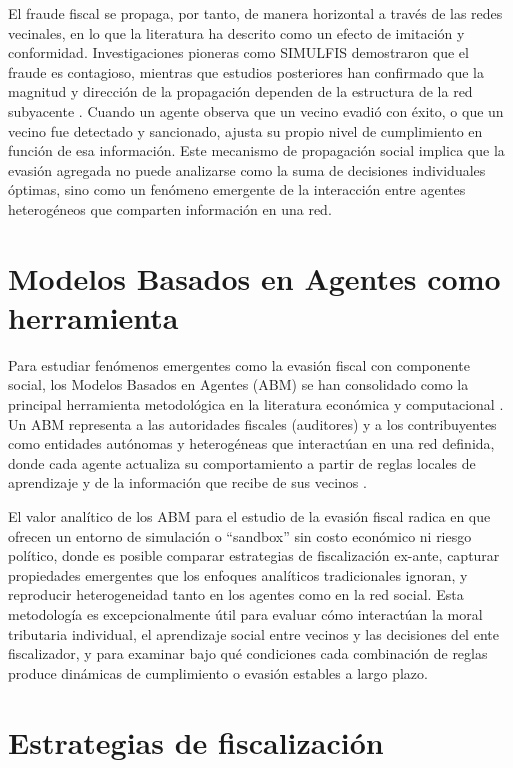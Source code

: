 El fraude fiscal se propaga, por tanto, de manera horizontal a través de las redes vecinales, en lo que la literatura ha descrito como un efecto de imitación y conformidad. Investigaciones pioneras como SIMULFIS \parencite{llacer2018simulfis, noguera2014tax} demostraron que el fraude es contagioso, mientras que estudios posteriores han confirmado que la magnitud y dirección de la propagación dependen de la estructura de la red subyacente \parencite{chica2021evolutionary}. Cuando un agente observa que un vecino evadió con éxito, o que un vecino fue detectado y sancionado, ajusta su propio nivel de cumplimiento en función de esa información. Este mecanismo de propagación social implica que la evasión agregada no puede analizarse como la suma de decisiones individuales óptimas, sino como un fenómeno emergente de la interacción entre agentes heterogéneos que comparten información en una red.

\section{Modelos Basados en Agentes como herramienta}
\label{sec:abm-breve}

Para estudiar fenómenos emergentes como la evasión fiscal con componente social, los Modelos Basados en Agentes (ABM) se han consolidado como la principal herramienta metodológica en la literatura económica y computacional \parencite{hokamp2010income}. Un ABM representa a las autoridades fiscales (auditores) y a los contribuyentes como entidades autónomas y heterogéneas que interactúan en una red definida, donde cada agente actualiza su comportamiento a partir de reglas locales de aprendizaje y de la información que recibe de sus vecinos \parencite{andrei2014agent}.

El valor analítico de los ABM para el estudio de la evasión fiscal radica en que ofrecen un entorno de simulación o ``sandbox'' sin costo económico ni riesgo político, donde es posible comparar estrategias de fiscalización ex-ante, capturar propiedades emergentes que los enfoques analíticos tradicionales ignoran, y reproducir heterogeneidad tanto en los agentes como en la red social. Esta metodología es excepcionalmente útil para evaluar cómo interactúan la moral tributaria individual, el aprendizaje social entre vecinos y las decisiones del ente fiscalizador, y para examinar bajo qué condiciones cada combinación de reglas produce dinámicas de cumplimiento o evasión estables a largo plazo.

\section{Estrategias de fiscalización}
\label{sec:estrategias-fiscalizacion}

